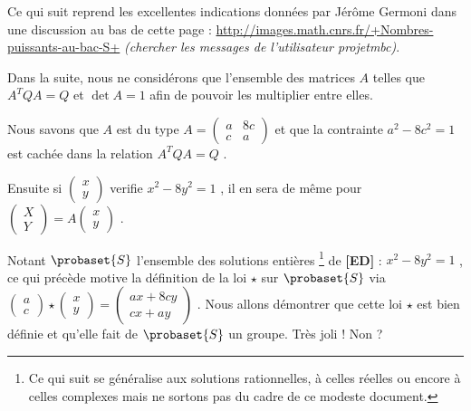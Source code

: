 Ce qui suit reprend les excellentes indications données par Jérôme Germoni dans une discussion au bas de cette page :
\url{http://images.math.cnrs.fr/+Nombres-puissants-au-bac-S+}
\textit{(chercher les messages de l'utilisateur projetmbc)}.


\bigskip

Dans la suite, nous ne considérons que l'ensemble des matrices $A$ telles que $A^T Q A = Q$ et $\det A = 1$ afin de pouvoir les multiplier entre elles.


\medskip

Nous savons que $A$ est du type 
$A
=
\begin{pmatrix} 
  a & 8c \\ 
  c & a
\end{pmatrix}$ 
et que la contrainte $a^2 - 8c^2 = 1$ est cachée dans la relation $A^T Q A = Q$ .


\medskip

Ensuite si
$\begin{pmatrix} 
  x \\ 
  y 
\end{pmatrix}$
verifie $x^2 - 8 y^2 = 1$ , il en sera de même pour
$\begin{pmatrix} 
  X \\ 
  Y 
\end{pmatrix}
=
A
\begin{pmatrix} 
  x \\ 
  y 
\end{pmatrix}$ .


\medskip

Notant $\probaset{S}$ l'ensemble des solutions entières
\footnote{
	Ce qui suit se généralise aux solutions rationnelles, à celles réelles ou encore à celles complexes mais ne sortons pas du cadre de ce modeste document.
}
de \textbf{[ED]} : $x^2 - 8 y^2 = 1$ , ce qui précède motive la définition de la loi $\star$ sur $\probaset{S}$ via
$\begin{pmatrix} 
  a \\ 
  c 
\end{pmatrix}
\star
\begin{pmatrix} 
  x \\ 
  y 
\end{pmatrix}
=
\begin{pmatrix} 
  a x + 8c y \\ 
  c x + a y
\end{pmatrix}$ .
Nous allons démontrer que cette loi $\star$ est bien définie et qu'elle fait de $\probaset{S}$ un groupe. Très joli ! Non ?



